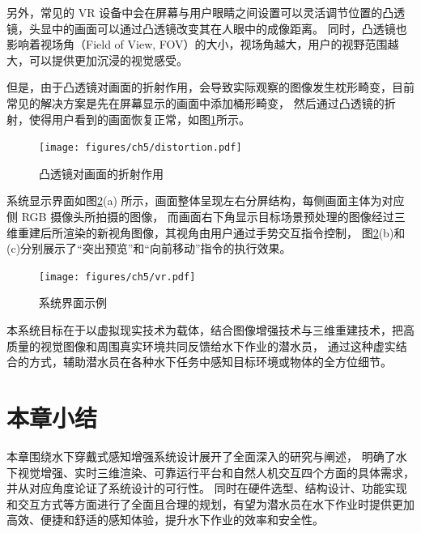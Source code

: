 另外，常见的 VR 设备中会在屏幕与用户眼睛之间设置可以灵活调节位置的凸透镜，头显中的画面可以通过凸透镜改变其在人眼中的成像距离。
同时，凸透镜也影响着视场角（Field of View, FOV）的大小，视场角越大，用户的视野范围越大，可以提供更加沉浸的视觉感受。

但是，由于凸透镜对画面的折射作用，会导致实际观察的图像发生枕形畸变，目前常见的解决方案是先在屏幕显示的画面中添加桶形畸变，
然后通过凸透镜的折射，使得用户看到的画面恢复正常，如图\ref{img:distortion}所示。
\begin{figure}[ht]
    \centering
    \texttt{[image: figures/ch5/distortion.pdf]}
    \caption{凸透镜对画面的折射作用}
    \label{img:distortion}
\end{figure}

系统显示界面如图\ref{img:inference}(a) 所示，画面整体呈现左右分屏结构，每侧画面主体为对应侧 RGB 摄像头所拍摄的图像，
而画面右下角显示目标场景预处理的图像经过三维重建后所渲染的新视角图像，其视角由用户通过手势交互指令控制，
图\ref{img:inference}(b)和(c)分别展示了“突出预览”和“向前移动”指令的执行效果。
\begin{figure}
    \centering
    \texttt{[image: figures/ch5/vr.pdf]}
    \caption{系统界面示例}
    \label{img:inference}
\end{figure}

本系统目标在于以虚拟现实技术为载体，结合图像增强技术与三维重建技术，把高质量的视觉图像和周围真实环境共同反馈给水下作业的潜水员，
通过这种虚实结合的方式，辅助潜水员在各种水下任务中感知目标环境或物体的全方位细节。


\section{本章小结}
本章围绕水下穿戴式感知增强系统设计展开了全面深入的研究与阐述，
明确了水下视觉增强、实时三维渲染、可靠运行平台和自然人机交互四个方面的具体需求，并从对应角度论证了系统设计的可行性。
同时在硬件选型、结构设计、功能实现和交互方式等方面进行了全面且合理的规划，有望为潜水员在水下作业时提供更加高效、便捷和舒适的感知体验，提升水下作业的效率和安全性。













